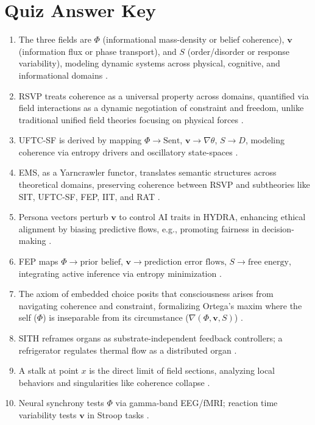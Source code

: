 \documentclass[12pt]{report}
\newcommand{\PhiRSVP}{\Phi}
\newcommand{\vRSVP}{\mathbf{v}}
\newcommand{\SRSVP}{S}
\begin{document}
\chapter{Quiz Answer Key}
\begin{enumerate}
    \item The three fields are \(\PhiRSVP\) (informational mass-density or belief coherence), \(\vRSVP\) (information flux or phase transport), and \(\SRSVP\) (order/disorder or response variability), modeling dynamic systems across physical, cognitive, and informational domains \citep{RSVPMeta2025}.
    \item RSVP treats coherence as a universal property across domains, quantified via field interactions as a dynamic negotiation of constraint and freedom, unlike traditional unified field theories focusing on physical forces \citep{RSVPMeta2025}.
    \item UFTC-SF is derived by mapping \(\PhiRSVP \to \text{Sent}\), \(\vRSVP \to \nabla\theta\), \(\SRSVP \to D\), modeling coherence via entropy drivers and oscillatory state-spaces \citep{Logan2025}.
    \item EMS, as a Yarncrawler functor, translates semantic structures across theoretical domains, preserving coherence between RSVP and subtheories like SIT, UFTC-SF, FEP, IIT, and RAT \citep{SocioeconomicFunctors2025}.
    \item Persona vectors perturb \(\vRSVP\) to control AI traits in HYDRA, enhancing ethical alignment by biasing predictive flows, e.g., promoting fairness in decision-making \citep{Chen2025, HYDRA2025}.
    \item FEP maps \(\PhiRSVP \to \text{prior belief}\), \(\vRSVP \to \text{prediction error flows}\), \(\SRSVP \to \text{free energy}\), integrating active inference via entropy minimization \citep{Friston2010}.
    \item The axiom of embedded choice posits that consciousness arises from navigating coherence and constraint, formalizing Ortega’s maxim where the self (\(\PhiRSVP\)) is inseparable from its circumstance (\(\nabla(\PhiRSVP, \vRSVP, \SRSVP)\)) \citep{SocioeconomicFunctors2025}.
    \item SITH reframes organs as substrate-independent feedback controllers; a refrigerator regulates thermal flow as a distributed organ \citep{SocioeconomicFunctors2025}.
    \item A stalk at point \(x\) is the direct limit of field sections, analyzing local behaviors and singularities like coherence collapse \citep{Bredon1997}.
    \item Neural synchrony tests \(\PhiRSVP\) via gamma-band EEG/fMRI; reaction time variability tests \(\vRSVP\) in Stroop tasks \citep{RSVPMeta2025, SemanticField2025}.
\end{enumerate}
\end{document}
